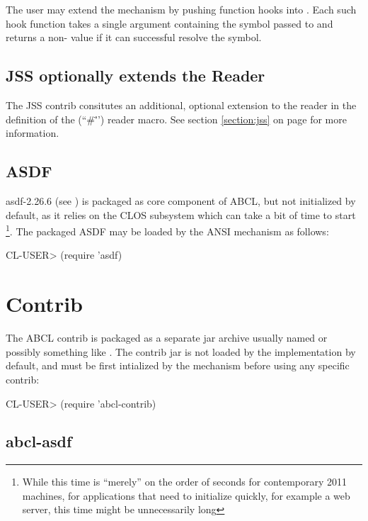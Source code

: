 \documentclass[10pt]{book}
\begin{document}
The user may extend the  mechanism by pushing
function hooks into .  Each
such hook function takes a single argument containing the symbol
passed to  and returns a non- value if it
can successful resolve the symbol.

\section{JSS optionally extends the Reader}

The JSS contrib consitutes an additional, optional extension to the
reader in the definition of the 
(``\#\"'') reader macro.  See section \ref{section:jss} on page
\pageref{section:jss} for more information.

\section{ASDF}

asdf-2.26.6 (see \cite{asdf}) is packaged as core component of ABCL,
but not initialized by default, as it relies on the CLOS subsystem
which can take a bit of time to start \footnote{While this time is
  ``merely'' on the order of seconds for contemporary 2011 machines,
  for applications that need to initialize quickly, for example a web
  server, this time might be unnecessarily long}.  The packaged ASDF
may be loaded by the \textsc{ANSI}  mechanism as
follows:

\begin{listing-lisp}
CL-USER> (require 'asdf)
\end{listing-lisp}

\chapter{Contrib}

The ABCL contrib is packaged as a separate jar archive usually named
 or possibly something like
.  The contrib jar is not loaded by the
implementation by default, and must be first intialized by the
 mechanism before using any specific contrib:

\begin{listing-lisp}
CL-USER> (require 'abcl-contrib)
\end{listing-lisp}

\section{abcl-asdf}
\end{document}
